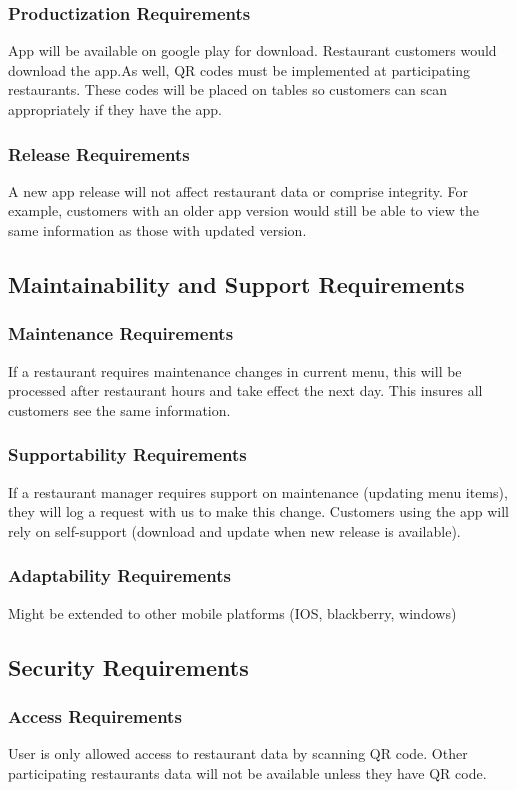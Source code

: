 \documentclass[12pt, titlepage]{article}
\begin{document}
\subsubsection{Productization Requirements}
App will be available on google play for download. Restaurant customers would download the app.As well, QR codes must be implemented at participating restaurants. These codes will be placed on tables so customers can scan appropriately if they have the app. 
\subsubsection{Release Requirements}
A new app release will not affect restaurant data or comprise integrity. For example, customers with an older app version would still be able to view the same information as those with updated version. 
\subsection{Maintainability and Support Requirements}
\subsubsection{Maintenance Requirements}
If a restaurant requires maintenance changes in current menu, this will be processed after restaurant hours and take effect the next day. This insures all customers see the same information. 
\subsubsection{Supportability Requirements}
If a restaurant manager requires support on maintenance (updating menu items), they will log a request with us to make this change. Customers using the app will rely on self-support (download and update when new release is available).
\subsubsection{Adaptability Requirements}
Might be extended to other mobile platforms (IOS, blackberry, windows) 
\subsection{Security Requirements}
\subsubsection{Access Requirements}
User is only allowed access to restaurant data by scanning QR code. Other participating restaurants data will not be available unless they have QR code. 
\end{document}
